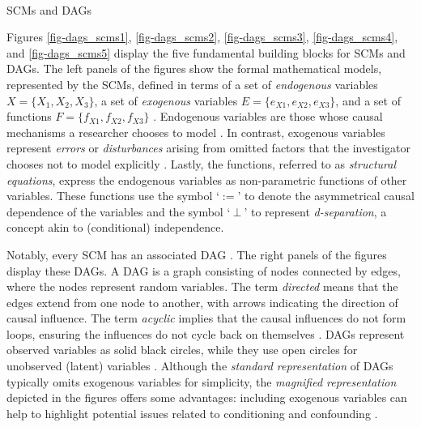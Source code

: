 \documentclass[
  authoryear,
  review,
  1p]{elsarticle}
\makeatletter
\let\oldparagraph\paragraph
\renewcommand{\paragraph}{
    \@ifstar
      \xxxParagraphStar
      \xxxParagraphNoStar
  }
\newcommand{\xxxParagraphStar}[1]{\oldparagraph*{#1}\mbox{}}
\newcommand{\xxxParagraphNoStar}[1]{\oldparagraph{#1}\mbox{}}
\makeatother
\begin{document}
\paragraph{SCMs and DAGs}\label{sec-appendix-B21}

Figures \ref{fig-dags_scms1}, \ref{fig-dags_scms2},
\ref{fig-dags_scms3}, \ref{fig-dags_scms4}, and \ref{fig-dags_scms5}
display the five fundamental building blocks for SCMs and DAGs. The left
panels of the figures show the formal mathematical models, represented
by the SCMs, defined in terms of a set of \emph{endogenous} variables
\(X=\{X_{1},X_{2},X_{3}\}\), a set of \emph{exogenous} variables
\(E=\{e_{X1},e_{X2},e_{X3}\}\), and a set of functions
\(F=\{f_{X1},f_{X2},f_{X3}\}\) \citep{Pearl_2009, Cinelli_et_al_2020}.
Endogenous variables are those whose causal mechanisms a researcher
chooses to model \citep{Neal_2020}. In contrast, exogenous variables
represent \emph{errors} or \emph{disturbances} arising from omitted
factors that the investigator chooses not to model explicitly
\citep[pp.~27,68]{Pearl_2009}. Lastly, the functions, referred to as
\emph{structural equations}, express the endogenous variables as
non-parametric functions of other variables. These functions use the
symbol `\(:=\)' to denote the asymmetrical causal dependence of the
variables and the symbol `\(\:\bot\:\)' to represent
\emph{d-separation}, a concept akin to (conditional) independence.

Notably, every SCM has an associated DAG
\citep{Pearl_et_al_2016, Cinelli_et_al_2020}. The right panels of the
figures display these DAGs. A DAG is a graph consisting of nodes
connected by edges, where the nodes represent random variables. The term
\emph{directed} means that the edges extend from one node to another,
with arrows indicating the direction of causal influence. The term
\emph{acyclic} implies that the causal influences do not form loops,
ensuring the influences do not cycle back on themselves
\citep{McElreath_2020}. DAGs represent observed variables as solid black
circles, while they use open circles for unobserved (latent) variables
\citep{Morgan_et_al_2014}. Although the \emph{standard representation}
of DAGs typically omits exogenous variables for simplicity, the
\emph{magnified representation} depicted in the figures offers some
advantages: including exogenous variables can help to highlight
potential issues related to conditioning and confounding
\citep{Cinelli_et_al_2020}.
\end{document}
